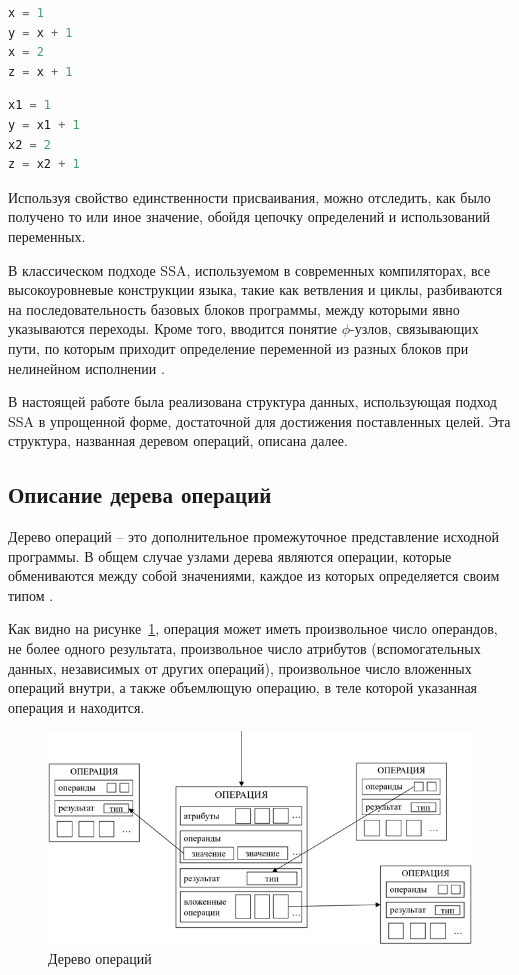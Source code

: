 \begin{lstlisting}[language=Python, caption=Программа в произвольной форме]
x = 1
y = x + 1
x = 2
z = x + 1
\end{lstlisting}

\clearpage

\begin{lstlisting}[language=Python, caption=Программа в форме SSA]
x1 = 1
y = x1 + 1
x2 = 2
z = x2 + 1
\end{lstlisting}

Используя свойство единственности присваивания, можно отследить, как было получено то или иное значение, обойдя цепочку определений и использований переменных.

В классическом подходе SSA, используемом в современных компиляторах, все высокоуровневые конструкции языка, такие как ветвления и циклы, разбиваются на последовательность базовых блоков программы, между которыми явно указываются переходы.
Кроме того, вводится понятие \(\phi\)-узлов, связывающих пути, по которым приходит определение переменной из разных блоков при нелинейном исполнении \cite{vladimirov}.

В настоящей работе была реализована структура данных, использующая подход SSA в упрощенной форме, достаточной для достижения поставленных целей.
Эта структура, названная деревом операций, описана далее.

\subsection{Описание дерева операций}

Дерево операций -- это дополнительное промежуточное представление исходной программы.
В общем случае узлами дерева являются операции, которые обмениваются между собой значениями, каждое из которых определяется своим типом \cite{mlir_intro}.

Как видно на рисунке~\ref{fig:optree_scheme}, операция может иметь произвольное число операндов, не более одного результата, произвольное число атрибутов (вспомогательных данных, независимых от других операций), произвольное число вложенных операций внутри, а также объемлющую операцию, в теле которой указанная операция и находится.

\begin{figure}[h]
    \centering
    \includegraphics[width=\textwidth]{images/optree-scheme.png}
    \caption{Дерево операций}
    \label{fig:optree_scheme}
\end{figure}

